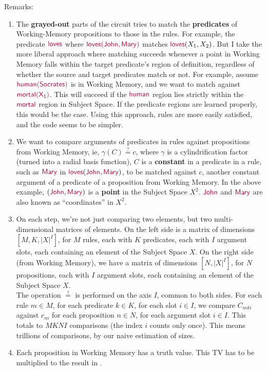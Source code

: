 Remarks:
\begin{enumerate}  %
	\item[\textbullet] The \textbf{grayed-out} parts of the circuit tries to match the \textbf{predicates} of Working-Memory propositions to those in the rules.  For example, the predicate ${\color{purple}\mathsf{loves}}$ where ${\color{purple}\mathsf{loves(John,Mary)}}$ matches ${\color{purple}\mathsf{loves}}(X_1,X_2)$.  But I take the more liberal approach where matching succeeds whenever a point in Working Memory falls within the target predicate's region of definition, regardless of whether the source and target predicates match or not.  For example, assume ${\color{purple}\mathsf{human(Socrates)}}$ is in Working Memory, and we want to match against ${\color{purple}\mathsf{mortal(X_1)}}$.  This will succeed if the ${\color{purple}\mathsf{human}}$ region lies strictly within the ${\color{purple}\mathsf{mortal}}$ region in Subject Space.  If the predicate regions are learned properly, this would be the case.  Using this approach, rules are more easily satisfied, and the code seems to be simpler.

	\item[\circled{1}] We want to compare arguments of predicates in rules against propositions from Working Memory, ie, $\gamma(C) \stackrel{?}{=} c$, where $\gamma$ is a cylindrification factor (turned into a radial basis function), $C$ is a \textbf{constant} in a predicate in a rule, such as ${\color{purple}\mathsf{Mary}}$ in ${\color{purple}\mathsf{loves}}({\color{purple}\mathsf{John}},{\color{purple}\mathsf{Mary}})$, to be matched against $c$, another constant argument of a predicate of a proposition from Working Memory.  In the above example, $({\color{purple}\mathsf{John}},{\color{purple}\mathsf{Mary}})$ is a \textbf{point} in the Subject Space $X^2$.  ${\color{purple}\mathsf{John}}$ and ${\color{purple}\mathsf{Mary}}$ are also known as ``coordinates'' in $X^2$.
	
	\item[\circled{2}] On each step, we're not just comparing two elements, but two multi-dimensional matrices of elements.  On the left side is a matrix of dimensions $[M,K,|X|^I]$, for $M$ rules, each with $K$ predicates, each with $I$ argument slots, each containing an element of the Subject Space $X$.  On the right side (from Working Memory), we have a matrix of dimensions $[N,|X|^I]$, for $N$ propositions, each with $I$ argument slots, each containing an element of the Subject Space $X$. \\

	The operation $\stackrel{?}{=}$ is performed on the axis $I$, common to both sides.  For each rule $m \in M$, for each predicate $k \in K$, for each slot $i \in I$, we compare $C_{mki}$ against $c_{ni}$ for each proposition $n \in N$, for each argument slot $i \in I$.  This totals to $MKNI$ comparisons (the index $i$ counts only once).  This means trillions of comparisons, by our naive estimation of sizes.

	\item[\circled{3}] Each proposition in Working Memory has a truth value.  This TV has to be multiplied to the result in .
\end{enumerate}

